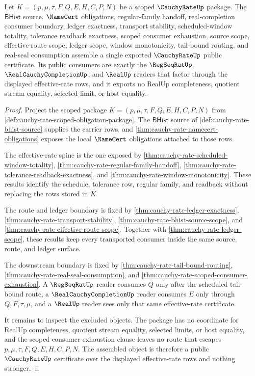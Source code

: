 \begin{theorem}
\label{thm:cauchy-rate-public-certificate}
Let $K=(p,\mu,\tau,F,Q,E,H,C,P,N)$ be a scoped $\CauchyRateUp$ package. The $\mathsf{BHist}$ source, $\NameCert$ obligations, regular-family handoff, real-completion consumer boundary, ledger exactness, transport stability, scheduled-window totality, tolerance readback exactness, scoped consumer exhaustion, source scope, effective-route scope, ledger scope, window monotonicity, tail-bound routing, and real-seal consumption assemble a single exported $\CauchyRateUp$ public certificate. Its public consumers are exactly the $\RegSeqRatUp$, $\RealCauchyCompletionUp$, and $\RealUp$ readers that factor through the displayed effective-rate rows, and it exports no RealUp completeness, quotient stream equality, selected limit, or host equality.
\end{theorem}
\begin{proof}
Project the scoped package $K=(p,\mu,\tau,F,Q,E,H,C,P,N)$ from \autoref{def:cauchy-rate-scoped-obligation-package}. The $\mathsf{BHist}$ source of \autoref{def:cauchy-rate-bhist-source} supplies the carrier rows, and \autoref{thm:cauchy-rate-namecert-obligations} exposes the local $\NameCert$ obligations attached to those rows.

The effective-rate spine is the one exposed by \autoref{thm:cauchy-rate-scheduled-window-totality}, \autoref{thm:cauchy-rate-regular-family-handoff}, \autoref{thm:cauchy-rate-tolerance-readback-exactness}, and \autoref{thm:cauchy-rate-window-monotonicity}. These results identify the schedule, tolerance row, regular family, and readback without replacing the rows stored in $K$.

The route and ledger boundary is fixed by \autoref{thm:cauchy-rate-ledger-exactness}, \autoref{thm:cauchy-rate-transport-stability}, \autoref{thm:cauchy-rate-bhist-source-scope}, and \autoref{thm:cauchy-rate-effective-route-scope}. Together with \autoref{thm:cauchy-rate-ledger-scope}, these results keep every transported consumer inside the same source, route, and ledger surface.

The downstream boundary is fixed by \autoref{thm:cauchy-rate-tail-bound-routing}, \autoref{thm:cauchy-rate-real-seal-consumption}, and \autoref{thm:cauchy-rate-scoped-consumer-exhaustion}. A $\RegSeqRatUp$ reader consumes $Q$ only after the scheduled tail-bound route, a $\RealCauchyCompletionUp$ reader consumes $E$ only through $Q,F,\tau,\mu$, and a $\RealUp$ reader sees only that same effective-rate certificate.

It remains to inspect the excluded objects. The package has no coordinate for RealUp completeness, quotient stream equality, selected limits, or host equality, and the scoped consumer-exhaustion clause leaves no route that escapes $p,\mu,\tau,F,Q,E,H,C,P,N$. The assembled object is therefore a public $\CauchyRateUp$ certificate over the displayed effective-rate rows and nothing stronger.
\end{proof}

